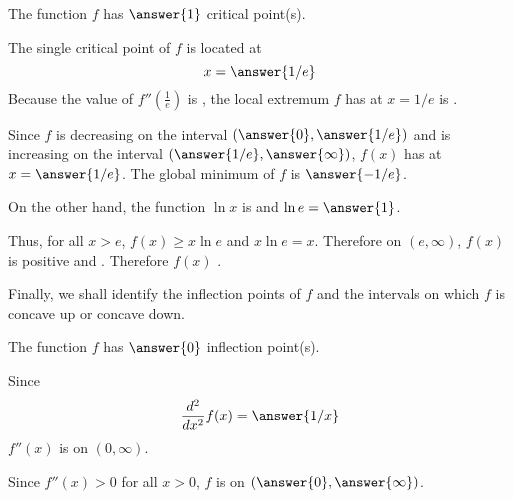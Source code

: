\documentclass{ximera}
\begin{document}
\begin{exercise}
\begin{exercise}
\begin{exercise}
\begin{exercise}
\begin{exercise}
The function $f$ has $\answer{1}$ critical point(s). 
\begin{exercise}
The single critical point of $f$ is located at
\[
x=\answer{1/e}
\]
Because the value of $f''(\frac{1}{e})$ is , the local extremum $f$ has at $x=1/e$ is .
\begin{exercise}
Since $f$ is decreasing on the interval $(\answer{0},\answer{1/e})$ and is increasing on the interval $(\answer{1/e},\answer{\infty})$, $f(x)$ has  at $x=\answer{1/e}$. The global minimum of $f$ is $\answer{-1/e}$.
\begin{exercise}
On the other hand, the function $\ln x$ is  and $\ln e=\answer{1}$. 
\begin{exercise}
Thus, for all $x>e$, $f(x)\ge x\ln e$ and $x\ln e=x$. Therefore on $(e,\infty)$, $f(x)$ is positive and  . Therefore $f(x)$ .
\begin{exercise}
Finally, we shall identify the inflection points of $f$ and the intervals on which $f$ is concave up or concave down.

The function $f$ has $\answer{0}$ inflection point(s).
\begin{exercise}
Since
\[
\frac{d^2}{dx^2}f(x)=\answer{1/x}
\]
$f''(x)$ is  on $(0,\infty)$. 
\begin{exercise}
Since $f''(x)>0$ for all $x>0$, $f$ is  on $(\answer{0},\answer{\infty})$.
\end{exercise}
\end{exercise}
\end{exercise}
\end{exercise}
\end{exercise}
\end{exercise}
\end{exercise}
\end{exercise}
\end{exercise}
\end{exercise}
\end{exercise}
\end{exercise}
\end{document}
